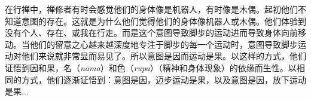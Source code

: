 在行禅中，禅修者有时会感觉他们的身体像是机器人，有时像是木偶。起初他们不知道意图的存在。这就是为什么他们觉得他们的身体像机器人或木偶。他们体验到没有个人、存在、或\1我在行走。而是这个意图导致脚步的运动进而导致身体向前移动。当他们的留意之心越来越深度地专注于脚步的每一个运动时，意图导致脚步运动对他们来说就非常显而易见了。所以意图是因而运动是果。以这样的方式，他们证悟到因和果，名（{\it n\=ama}）和色（{\it r\=upa}）（精神和身体现象）的依缘而生性。以相同的方式，他们逐渐证悟到：意图是因，迈步运动是果，以及意图是因，放下运动是果...



\endchapter

\byebye
